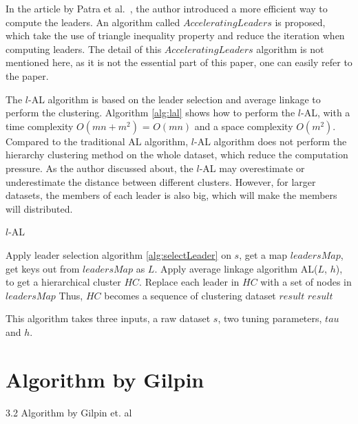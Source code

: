 \documentclass[utf8,english]{gradu3}
\begin{document}
In the article by Patra et al.~\cite{patra2010distance}, the author introduced a more efficient way to compute the leaders. An algorithm called $Accelerating Leaders$ is proposed, which take the use of triangle inequality property and reduce the iteration when computing leaders. The detail of this $Accelerating Leaders$ algorithm is not mentioned here, as it is not the essential part of this paper, one can easily refer to the paper.


The $l$-AL algorithm is based on the leader selection and average linkage to perform the clustering. 
Algorithm \ref*{alg:lal} shows how to perform the $l$-AL, with a time complexity $O(mn + m^2)$ = $O(mn)$ and a space complexity $O(m^2)$.
Compared to the traditional AL algorithm, $l$-AL algorithm does not perform the hierarchy clustering method on the whole dataset, which reduce the computation pressure. 
As the author discussed about, the $l$-AL may overestimate or underestimate the distance between different clusters.
However, for larger datasets, the members of each leader is also big, which will make the members will distributed.


\algrenewcommand\Return{\State \algorithmicreturn{} }
\begin{algorithm}[h]
	\caption{$l$-AL}
	\label{alg:lal}
	\begin{algorithmic}[1]
		\State Apply leader selection algorithm \ref{alg:selectLeader} on $s$, get a map $leadersMap$, get keys out from $leadersMap$ as $L$.
		\State Apply average linkage algorithm AL($L$, $h$), to get a hierarchical cluster $HC$.
		\State Replace each leader in $HC$ with a set of nodes in $leadersMap$
		\State Thus, $HC$ becomes a sequence of clustering dataset $result$
		\Return $result$
		\EndProcedure
		
		This algorithm takes three inputs, a raw dataset $s$, two tuning parameters, $tau$ and $h$.
	\end{algorithmic}
\end{algorithm}




\section{Algorithm by Gilpin}
3.2 Algorithm by Gilpin et. al
\end{document}

